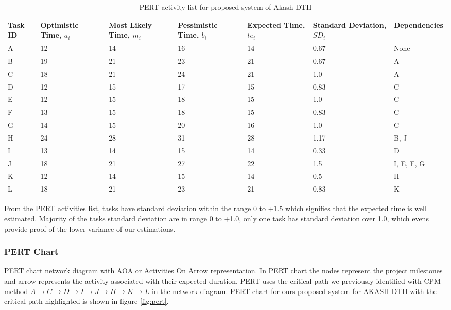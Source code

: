 \begin{spacing}{1}
\begin{table}[H]
	\begin{center}
		\begin{tabular}{| p{1cm} | p{2cm}| p{2cm} | p{2cm} | p{2cm} |p{2cm} | p{3cm} |}
			\hline
			Task ID  & Optimistic Time, $a_i$ &   Most Likely Time, $m_i$ & Pessimistic Time, $b_i$ & Expected Time, $te_i$ & Standard Deviation, $SD_i$ & Dependencies \\
			\hline
			A  & 12 & 14 & 16 & 14 & 0.67 & None \\
			\hline
			B  & 19 & 21 & 23 & 21  & 0.67 & A \\
			\hline
			C  & 18 & 21 & 24 & 21 & 1.0 & A \\
			\hline
			D  & 12 & 15  & 17 & 15 & 0.83 & C \\
			\hline
			E & 12 & 15 & 18 & 15 & 1.0 & C \\
			\hline
			F  & 13 & 15 & 18 & 15 & 0.83 & C \\
			\hline
			G  & 14 & 15 & 20 & 16 & 1.0  & C \\
			\hline
			H &  24 & 28 & 31 & 28 & 1.17 & B,  J \\
			\hline
			I  & 13 & 14 & 15 & 14 & 0.33 &  D \\
			\hline
			J  & 18 & 21 & 27 & 22 & 1.5  & I, E, F, G \\
			\hline
			K  & 12  & 14 & 15 & 14 & 0.5  & H \\
			\hline
			L  & 18 & 21 & 23 & 21 & 0.83 & K \\
			\hline    
		\end{tabular}
	\end{center}
	\caption{PERT activity list for proposed system of Akash DTH }
	\label{chart:PERT}
\end{table}

From the PERT activities list, tasks have standard deviation within the range 0 to +1.5 which signifies that the expected time is well estimated. Majority of the tasks standard deviation are in range 0 to +1.0, only one task has standard deviation over 1.0, which evens provide proof of the lower variance of our estimations. 

\subsubsection{PERT Chart}
PERT chart network diagram with AOA or Activities On Arrow representation. In PERT chart the nodes represent the project milestones and arrow represents the activity associated with their expected duration. PERT uses the critical path we previously identified with CPM method $ A \to C \to D \to I \to J \to H \to K \to L $ in the network diagram. PERT chart for ours proposed system for AKASH DTH with the critical path highlighted is shown in figure \ref{fig:pert}.


\end{spacing}
